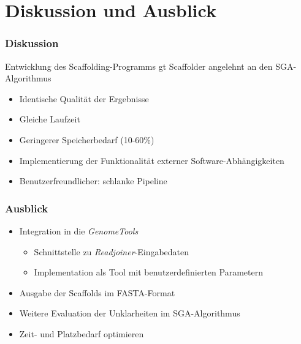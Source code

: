 \documentclass[xcolor=pst]{beamer}
\begin{document}
\section{Diskussion und Ausblick}
\begin{frame}
  \frametitle{Diskussion}
  Entwicklung des Scaffolding-Programms gt Scaffolder angelehnt an den SGA-Algorithmus
  \begin{itemize}
    \item Identische Qualität der Ergebnisse
    \item Gleiche Laufzeit
    \item Geringerer Speicherbedarf (10-60\%)
    \item Implementierung der Funktionalität externer Software-Abhängigkeiten
    \item Benutzerfreundlicher: schlanke Pipeline
  \end{itemize}
\end{frame}

\begin{frame}
  \frametitle{Ausblick}
  \begin{itemize}
    \item Integration in die \textit{GenomeTools}
    \begin{itemize}
      \item Schnittstelle zu \textit{Readjoiner}-Eingabedaten
      \item Implementation als Tool mit benutzerdefinierten Parametern
    \end{itemize}
    \item Ausgabe der Scaffolds im FASTA-Format
    \item Weitere Evaluation der Unklarheiten im SGA-Algorithmus
    \item Zeit- und Platzbedarf optimieren
  \end{itemize}
\end{frame}
\end{document}
